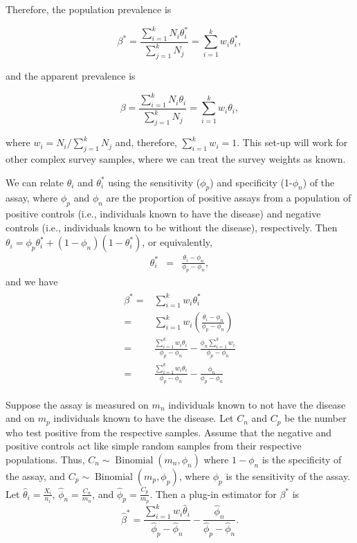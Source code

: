 \documentclass[AMA,STIX1COL]{WileyNJD-v2}
\begin{document}
Therefore, the population prevalence is 

\begin{equation}
    \beta^* = \frac{\sum_{i=1}^k N_i \theta_i^*}{\sum_{j=1}^k N_j} = \sum_{i=1}^k w_i \theta_i^*,
    \label{eq:pop-prev}
\end{equation}

and the apparent prevalence is 

\begin{equation}
    \beta = \frac{\sum_{i=1}^k N_i \theta_i}{\sum_{j=1}^k N_j} = \sum_{i=1}^k w_i \theta_i,
    \label{eq:app-prev}
\end{equation}

where \( w_i = N_i / \sum_{j=1}^k N_j \) and, therefore, \( \sum_{i=1}^k w_i = 1 \).
This set-up will work for other complex survey samples, where we can treat the survey weights as known.

We can relate $\theta_i$ and $\theta_i^*$ using the sensitivity ($\phi_p$)  and specificity (1-$\phi_n$) of the assay, 
where  $\phi_p$ and $\phi_n$  are the proportion of positive assays from a population of  positive controls (i.e., individuals known to have the disease) and 
negative controls (i.e., individuals known to be  without the disease), respectively. Then
$\theta_i = \phi_p \theta_i^* + (1-\phi_n) (1-\theta_i^*)$, or equivalently,  
\begin{eqnarray*}
\theta_i^* & = & \frac{ \theta_i - \phi_n }{\phi_p - \phi_n},
\end{eqnarray*}
and we have
\begin{align}
\begin{split}
  \beta^*   =&   \sum_{i=1}^k w_i \theta_i^* \\
            =&  \sum_{i=1}^k w_i \left( \frac{\theta_i - \phi_n}{\phi_p - \phi_n} \right) \\
            =&   \frac{\sum_{i=1}^k w_i \theta_i}{\phi_p - \phi_n} - \frac{\phi_n \sum_{i=1}^k w_i}{\phi_p - \phi_n} \\
            =&   \frac{\sum_{i=1}^k w_i \theta_i}{\phi_p - \phi_n} - \frac{\phi_n}{\phi_p - \phi_n}
            \label{eq:long-beta}
\end{split}
\end{align}


Suppose the assay is measured on \( m_n \) individuals known to not have the disease and on \( m_p \) individuals known to have the disease.
Let \( C_n \) and \( C_p \) be the number who test positive from the respective samples.
Assume that the negative and positive controls act like simple random samples from their respective populations.
Thus, \( C_n \sim \operatorname{Binomial}(m_n, \phi_n) \) where \( 1 - \phi_n \) is the specificity of the assay, and \( C_p \sim \operatorname{Binomial}(m_p, \phi_p) \), where  \( \phi_p \) is the sensitivity of the assay.
Let \( \hat{\theta}_i = \frac{X_i}{n_i} \), \( \hat{\phi}_n = \frac{C_n}{m_n} \), and \( \hat{\phi}_p = \frac{C_p}{m_p} \).
Then a plug-in estimator for \( \beta^* \) is 
\begin{equation}
    \hat{\beta}^* = \frac{\sum_{i=1}^k w_i \hat{\theta}_i}{\hat{\phi}_p - \hat{\phi}_n} - \frac{\hat{\phi}_n}{\hat{\phi}_p - \hat{\phi}_n}. \label{eq:betastarhat}
\end{equation}
\end{document}
